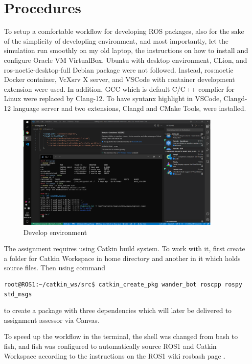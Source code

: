 \newpage
\section{Procedures}

To setup a comfortable workflow for developing ROS packages, also for the sake of the simplicity of developling environment, and most importantly, let the simulation run smoothly on my old laptop, the instructions on how to install and configure Oracle VM VirtualBox, Ubuntu with desktop environment, CLion, and ros-noetic-desktop-full Debian package were not followed. Instead, ros:noetic Docker container, VcXsrv X server, and VSCode with container development extension were used. In addition, GCC which is default C/C++ complier for Linux were replaced by Clang-12. To have syntanx highlight in VSCode, Clangd-12 language server and two extensions, Clangd and CMake Tools, were installed.

\begin{figure}[htbp]
   \centering
   \includegraphics[width=0.9\textwidth]{figures/devel_env.png}
   \caption{Develop environment}
   \label{fig:devel_env}
\end{figure}

The assignment requires using Catkin build system. To work with it, first create a folder for Catkin Workspace in home directory and another in it which holds source files. Then using command
\begin{verbatim}
root@ROS1:~/catkin_ws/src$ catkin_create_pkg wander_bot roscpp rospy std_msgs
\end{verbatim}
to create a package with three dependencies which will later be delivered to assignment assessor via Canvas.

To speed up the workflow in the terminal, the shell was changed from bash to fish, and fish was configured to automatically source ROS1 and Catkin Workspace according to the instructions on the ROS1 wiki rosbash page \cite{ref:rosbash}.

